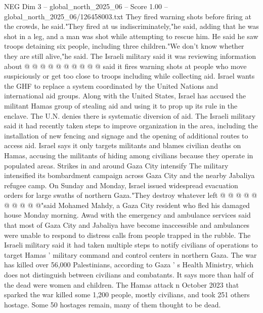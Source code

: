 \begin{textsample}{NEG Dim 3 – global\_north\_2025\_06 – Score 1.00 – global\_north\_2025\_06/126458003.txt}
They fired warning shots before firing at the crowds, he said."They fired at us indiscriminately,"he said, adding that he was shot in a leg, and a man was shot while attempting to rescue him.
He said he saw troops detaining six people, including three children."We don't know whether they are still alive,"he said.
The Israeli military said it was reviewing information about @ @ @ @ @ @ @ @ @ @ said it fires warning shots at people who move suspiciously or get too close to troops including while collecting aid.
Israel wants the GHF to replace a system coordinated by the United Nations and international aid groups.
Along with the United States, Israel has accused the militant Hamas group of stealing aid and using it to prop up its rule in the enclave.
The U.N. denies there is systematic diversion of aid.
The Israeli military said it had recently taken steps to improve organization in the area, including the installation of new fencing and signage and the opening of additional routes to access aid.
Israel says it only targets militants and blames civilian deaths on Hamas, accusing the militants of hiding among civilians because they operate in populated areas.
Strikes in and around Gaza City intensify The military intensified its bombardment campaign across Gaza City and the nearby Jabaliya refugee camp.
On Sunday and Monday, Israel issued widespread evacuation orders for large swaths of northern Gaza."They destroy whatever left @ @ @ @ @ @ @ @ @ @"said Mohamed Mahdy, a Gaza City resident who fled his damaged house Monday morning.
Awad with the emergency and ambulance services said that most of Gaza City and Jabaliya have become inaccessible and ambulances were unable to respond to distress calls from people trapped in the rubble.
The Israeli military said it had taken multiple steps to notify civilians of operations to target Hamas ' military command and control centers in northern Gaza.
The war has killed over 56,000 Palestinians, according to Gaza ' s Health Ministry, which does not distinguish between civilians and combatants.
It says more than half of the dead were women and children.
The Hamas attack n October 2023 that sparked the war killed some 1,200 people, mostly civilians, and took 251 others hostage.
Some 50 hostages remain, many of them thought to be dead.

\end{textsample}
